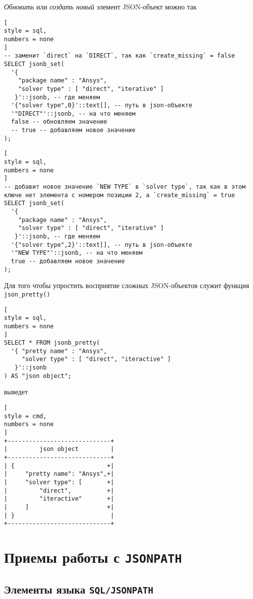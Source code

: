 \documentclass[%
	11pt,
	a4paper,
	utf8,
		]{article}
\begin{document}
\emph{Обновить} или \emph{создать новый} элемент JSON-объект можно так

\begin{lstlisting}[
style = sql, 
numbers = none
]
-- заменит `direct` на `DIRECT`, так как `create_missing` = false
SELECT jsonb_set(
  '{
    "package name" : "Ansys",
    "solver type" : [ "direct", "iterative" ]
   }'::jsonb, -- где меняем
  '{"solver type",0}'::text[], -- путь в json-объекте
  '"DIRECT"'::jsonb, -- на что меняем
  false -- обновляем значение
  -- true -- добавляем новое значение
);
\end{lstlisting}

\begin{lstlisting}[
style = sql, 
numbers = none
]
-- добавит новое значение `NEW TYPE` в `solver type`, так как в этом ключе нет элемента с номером позиции 2, а `create_missing` = true
SELECT jsonb_set(
  '{
    "package name" : "Ansys",
    "solver type" : [ "direct", "iterative" ]
   }'::jsonb, -- где меняем
  '{"solver type",2}'::text[], -- путь в json-объекте
  '"NEW TYPE"'::jsonb, -- на что меняем
  true -- добавляем новое значение
);
\end{lstlisting}

Для того чтобы упростить восприятие сложных JSON-объектов служит функция \texttt{json\_pretty()}
\begin{lstlisting}[
style = sql, 
numbers = none
]
SELECT * FROM jsonb_pretty(
  '{ "pretty name" : "Ansys",
     "solver type" : [ "direct", "iteractive" ]
   }'::jsonb
) AS "json object";
\end{lstlisting}
выведет
\begin{lstlisting}[
style = cmd,
numbers = none
]
+-----------------------------+
|         json object         |
+-----------------------------+
| {                          +|
|     "pretty name": "Ansys",+|
|     "solver type": [       +|
|         "direct",          +|
|         "iteractive"       +|
|     ]                      +|
| }                           |
+-----------------------------+
\end{lstlisting}

\section{Приемы работы с \texttt{JSONPATH}}

\subsection{Элементы языка \texttt{SQL/JSONPATH}}
\end{document}
